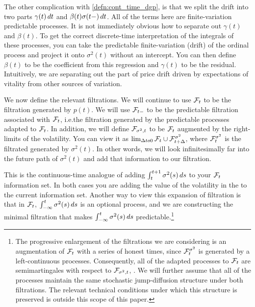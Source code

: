 \documentclass[11pt, letterpaper, twoside, final]{article}
\begin{document}
The other complication with \cref{defn:cont_time_dgp}, is that we split the drift into two parts $\gamma(t)\mathop{}\!d t$
and $\beta(t) \sigma(t-) \mathop{}\!d t$. 
All of the terms here are finite-variation predictable processes.
It is not immediately obvious how to separate out $\gamma(t)$ and $\beta(t)$.
To get the correct discrete-time interpretation of the integrals of these processes, you can take the predictable
finite-variation (drift) of the ordinal process and project it onto $\sigma^2(t)$ without an intercept.
You can then define $\beta(t)$ to be the coefficient from this regression and $\gamma(t)$ to be the residual.
Intuitively, we are separating out the part of price drift driven by expectations of vitality from other sources
of variation.


We now define the relevant filtrations.
We will continue to use $\mathcal{F}_t$ to be the filtration generated by $p(t)$.
We will use $\mathcal{F}_{t-}$ to be the predictable filtration associated with $\mathcal{F}_t$, i.e.\@ the filtration generated by
the predictable processes adapted to $\mathcal{F}_t$.
In addition, we will define $\mathcal{F}_{\sigma^2, t}$ to be $\mathcal{F}_t$ augmented by the right-limits of the volatility. 
You can view it as $\lim_{\Delta to 0} \mathcal{F}_t \cup \mathcal{F}^{\sigma^2}_{t+\Delta}$, where $\mathcal{F}^{\sigma^2}_t$ is the
filtrated generated by $\sigma^2(t)$.
In other words, we will look infinitesimally far into the future path of $\sigma^2(t)$ and add that information to
our filtration.

This is the continuous-time analogue of adding $\int_t^{t+1} \sigma^2(s) \mathop{}\!d s$ to your $\mathcal{F}_t$ information set.
In both cases you are adding the value of the volatility in the  to the current information
set.
Another way to view this expansion of filtration is that in $\mathcal{F}_t$, $\int^t_{-\infty} \sigma^2(s) \mathop{}\!d s$ is an
optional process, and we are constructing the minimal filtration that makes $\int^t_{-\infty} \sigma^2(s) \mathop{}\!d s$
predictable.\footnote{The progressive enlargement of the filtrations we are considering is an augmentation of
    $\mathcal{F}_t$ with a series of honest times, since $\mathcal{F}^{\sigma^2}_{t}$ is generated by a left-continuous processes.
    Consequently, all of the adapted processes to $\mathcal{F}_t$ are semimartingales with respect to $\mathcal{F}_{\sigma^2,t}$,
    \parencite[Theorem C]{barlow1978study}.  We will further assume that all of the processes maintain the same
stochastic jump-diffusion structure under both filtrations. The relevant technical conditions under which this
structure is preserved is outside this scope of this paper.}
\end{document}
